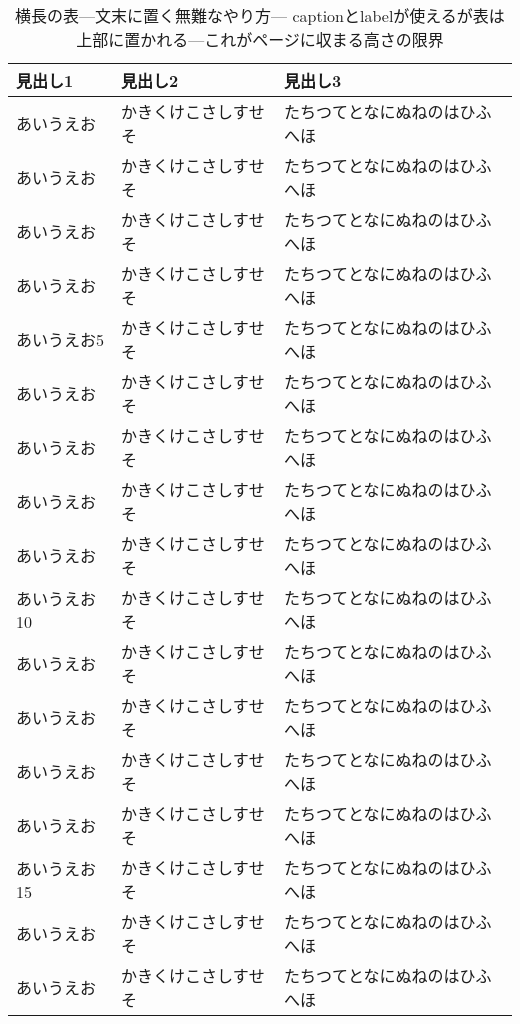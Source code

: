 \documentclass{jsce}
\begin{document}
\onecolumn
\thispagestyle{empty} %
\landscape
\mbox{}
\vfill
%
\begin{table}
\vspace*{4mm} %
\begin{center}
\caption{横長の表---文末に置く無難なやり方--- captionとlabelが使えるが表は上部に置かれる---これがページに収まる高さの限界}
\label{tab:landscape1}
\begin{tabular}{|p{6cm}|p{8cm}|p{8cm}|} \hline
見出し1 & 見出し2 & 見出し3 \\ \hline\hline
あいうえお & かきくけこさしすせそ & たちつてとなにぬねのはひふへほ \\ \hline
あいうえお & かきくけこさしすせそ & たちつてとなにぬねのはひふへほ \\ \hline
あいうえお & かきくけこさしすせそ & たちつてとなにぬねのはひふへほ \\ \hline
あいうえお & かきくけこさしすせそ & たちつてとなにぬねのはひふへほ \\ \hline
あいうえお5 & かきくけこさしすせそ & たちつてとなにぬねのはひふへほ \\ \hline
あいうえお & かきくけこさしすせそ & たちつてとなにぬねのはひふへほ \\ \hline
あいうえお & かきくけこさしすせそ & たちつてとなにぬねのはひふへほ \\ \hline
あいうえお & かきくけこさしすせそ & たちつてとなにぬねのはひふへほ \\ \hline
あいうえお & かきくけこさしすせそ & たちつてとなにぬねのはひふへほ \\ \hline
あいうえお10 & かきくけこさしすせそ & たちつてとなにぬねのはひふへほ \\ \hline
あいうえお & かきくけこさしすせそ & たちつてとなにぬねのはひふへほ \\ \hline
あいうえお & かきくけこさしすせそ & たちつてとなにぬねのはひふへほ \\ \hline
あいうえお & かきくけこさしすせそ & たちつてとなにぬねのはひふへほ \\ \hline
あいうえお & かきくけこさしすせそ & たちつてとなにぬねのはひふへほ \\ \hline
あいうえお15 & かきくけこさしすせそ & たちつてとなにぬねのはひふへほ \\ \hline
あいうえお & かきくけこさしすせそ & たちつてとなにぬねのはひふへほ \\ \hline
あいうえお & かきくけこさしすせそ & たちつてとなにぬねのはひふへほ \\ \hline

\end{tabular}
\end{center}
\end{table}
\end{document}
